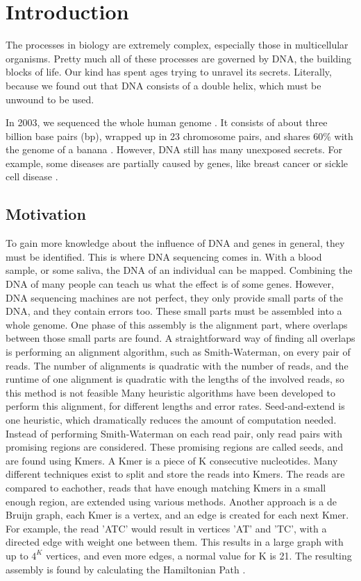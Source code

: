 \documentclass[../thesis.tex]{subfiles}
\begin{document}
\chapter{Introduction}
\ifdefined\main
\else

\fi

The processes in biology are extremely complex, especially those in multicellular organisms.
Pretty much all of these processes are governed by DNA, the building blocks of life.
Our kind has spent ages trying to unravel its secrets.
Literally, because we found out that DNA consists of a double helix, which must be unwound to be used.

In 2003, we sequenced the whole human genome {\cite{human_genome_project}}.
It consists of about three billion base pairs (bp), wrapped up in 23 chromosome pairs, and shares 60\% with the genome of a banana \cite{banana}.
However, DNA still has many unexposed secrets.
For example, some diseases are partially caused by genes, like breast cancer or sickle cell disease \cite{genomic_diseases}.

\section{Motivation}
To gain more knowledge about the influence of DNA and genes in general, they must be identified.
This is where DNA sequencing comes in.
With a blood sample, or some saliva, the DNA of an individual can be mapped.
Combining the DNA of many people can teach us what the effect is of some genes.
However, DNA sequencing machines are not perfect, they only provide small parts of the DNA, and they contain errors too.
These small parts must be assembled into a whole genome.
One phase of this assembly is the alignment part, where overlaps between those small parts are found.
A straightforward way of finding all overlaps is performing an alignment algorithm, such as Smith-Waterman, on every pair of reads.
The number of alignments is quadratic with the number of reads, and the runtime of one alignment is quadratic with the lengths of the involved reads, so this method is not feasible
Many heuristic algorithms have been developed to perform this alignment, for different lengths and error rates.
Seed-and-extend is one heuristic, which dramatically reduces the amount of computation needed.
Instead of performing Smith-Waterman on each read pair, only read pairs with promising regions are considered.
These promising regions are called seeds, and are found using Kmers.
A Kmer is a piece of K consecutive nucleotides.
Many different techniques exist to split and store the reads into Kmers.
The reads are compared to eachother, reads that have enough matching Kmers in a small enough region, are extended using various methods.
Another approach is a de Bruijn graph, each Kmer is a vertex, and an edge is created for each next Kmer.
For example, the read 'ATC' would result in vertices 'AT' and 'TC', with a directed edge with weight one between them.
This results in a large graph with up to $4^K$ vertices, and even more edges, a normal value for K is 21.
The resulting assembly is found by calculating the Hamiltonian Path \cite{Euler_Hamil_paths}.
\end{document}
